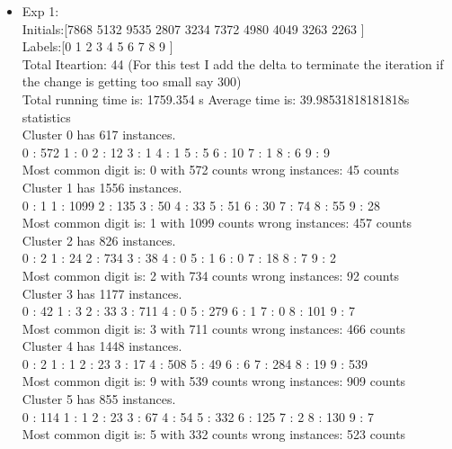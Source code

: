 \documentclass[paper=a4, fontsize=11pt]{scrartcl} %
\numberwithin{equation}{section} %
\numberwithin{figure}{section} %
\numberwithin{table}{section} %
\begin{document}
\begin{itemize}
	\item Exp 1:  \\

Initials:[7868 5132 9535 2807 3234 7372 4980 4049 3263 2263 ]\\

Labels:[0 1 2 3 4 5 6 7 8 9 ]\\

Total Iteartion: 44 (For this test I add the delta to terminate the iteration if the change is getting too small say 300) \\
Total running time is: 1759.354 s Average time is: 39.98531818181818s \\

statistics\\

Cluster 0 has 617 instances. \\
0 : 572	1 : 0	2 : 12	3 : 1	4 : 1	5 : 5	6 : 10	7 : 1	8 : 6	9 : 9	\\
Most common digit is: 0 with 572 counts	wrong instances: 45 counts\\

Cluster 1 has 1556 instances. \\
0 : 1	1 : 1099	2 : 135	3 : 50	4 : 33	5 : 51	6 : 30	7 : 74	8 : 55	9 : 28	\\
Most common digit is: 1 with 1099 counts	wrong instances: 457 counts\\

Cluster 2 has 826 instances. \\
0 : 2	1 : 24	2 : 734	3 : 38	4 : 0	5 : 1	6 : 0	7 : 18	8 : 7	9 : 2	\\
Most common digit is: 2 with 734 counts	wrong instances: 92 counts\\

Cluster 3 has 1177 instances. \\
0 : 42	1 : 3	2 : 33	3 : 711	4 : 0	5 : 279	6 : 1	7 : 0	8 : 101	9 : 7	\\
Most common digit is: 3 with 711 counts	wrong instances: 466 counts\\

Cluster 4 has 1448 instances. \\
0 : 2	1 : 1	2 : 23	3 : 17	4 : 508	5 : 49	6 : 6	7 : 284	8 : 19	9 : 539	\\
Most common digit is: 9 with 539 counts	wrong instances: 909 counts\\

Cluster 5 has 855 instances. \\
0 : 114	1 : 1	2 : 23	3 : 67	4 : 54	5 : 332	6 : 125	7 : 2	8 : 130	9 : 7	\\
Most common digit is: 5 with 332 counts	wrong instances: 523 counts\\


\end{itemize}
\end{document}
